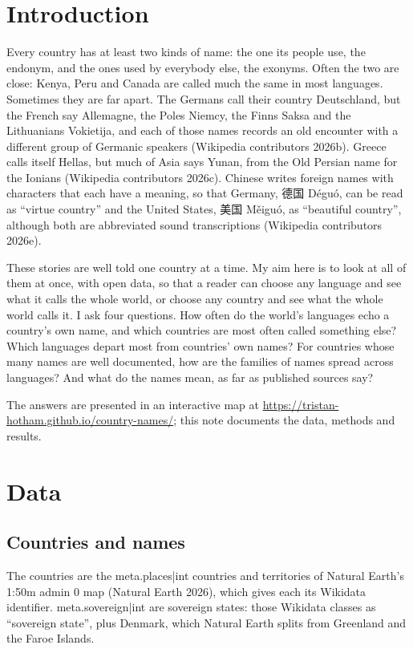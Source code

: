 \documentclass[11pt,a4paper]{article}
\newcommand{\zh}[1]{{\cjk #1}}
\begin{document}
\section{Introduction}

Every country has at least two kinds of name: the one its people use, the endonym, and the ones used by everybody else, the exonyms. Often the two are close: Kenya, Peru and Canada are called much the same in most languages. Sometimes they are far apart. The Germans call their country Deutschland, but the French say Allemagne, the Poles Niemcy, the Finns Saksa and the Lithuanians Vokietija, and each of those names records an old encounter with a different group of Germanic speakers (Wikipedia contributors 2026b). Greece calls itself Hellas, but much of Asia says Yunan, from the Old Persian name for the Ionians (Wikipedia contributors 2026c). Chinese writes foreign names with characters that each have a meaning, so that Germany, \zh{德国} Déguó, can be read as ``virtue country'' and the United States, \zh{美国} Měiguó, as ``beautiful country'', although both are abbreviated sound transcriptions (Wikipedia contributors 2026e).

These stories are well told one country at a time. My aim here is to look at all of them at once, with open data, so that a reader can choose any language and see what it calls the whole world, or choose any country and see what the whole world calls it. I ask four questions. How often do the world's languages echo a country's own name, and which countries are most often called something else? Which languages depart most from countries' own names? For countries whose many names are well documented, how are the families of names spread across languages? And what do the names mean, as far as published sources say?

The answers are presented in an interactive map at \url{https://tristan-hotham.github.io/country-names/}; this note documents the data, methods and results.

\section{Data}

\subsection{Countries and names}

The countries are the {{meta.places|int}} countries and territories of Natural Earth's 1:50m admin 0 map (Natural Earth 2026), which gives each its Wikidata identifier. {{meta.sovereign|int}} are sovereign states: those Wikidata classes as ``sovereign state'', plus Denmark, which Natural Earth splits from Greenland and the Faroe Islands.
\end{document}
